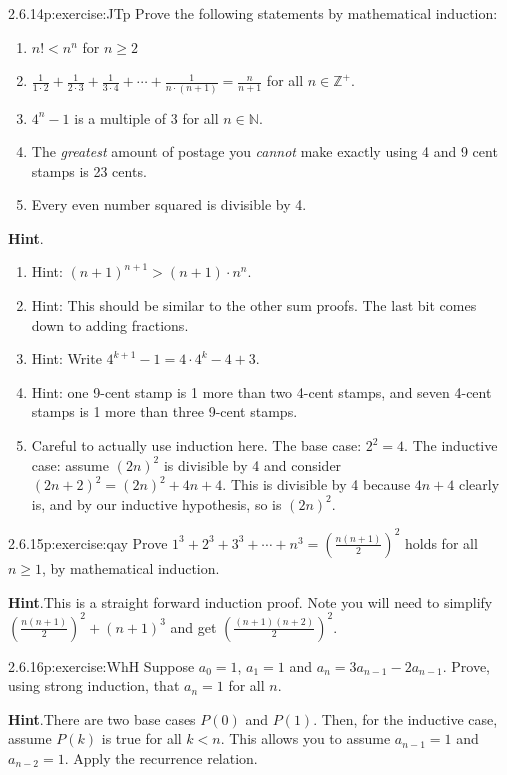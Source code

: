 \documentclass[twoside,11pt,]{book}
\newcommand{\blocktitlefont}{\relax}
\numberwithin{equation}{chapter}
\renewcommand{\d}{\displaystyle}
\newcommand{\N}{\mathbb N}
\newcommand{\Z}{\mathbb Z}
\newcommand{\lt}{<}
\begin{document}
\begin{divisionsolution}{2.6.14}{}{p:exercise:JTp}%
Prove the following statements by mathematical induction:%
\begin{enumerate}[label=(\alph*)]
\item{}\(n! \lt n^n\) for \(n \ge 2\)%
\item{}\(\d\frac{1}{1\cdot 2} + \frac{1}{2\cdot 3} +\frac{1}{3\cdot 4}+\cdots + \frac{1}{n\cdot(n+1)} = \d\frac{n}{n+1}\) for all \(n \in \Z^+\).%
\item{}\(4^n - 1\) is a multiple of 3 for all \(n \in \N\).%
\item{}The \emph{greatest} amount of postage you \emph{cannot} make exactly using 4 and 9 cent stamps is 23 cents.%
\item{}Every even number squared is divisible by 4.%
\end{enumerate}
%
\par\smallskip%
\noindent\textbf{\blocktitlefont Hint}.\quad{}%
\begin{enumerate}[label=(\alph*)]
\item{}Hint: \((n+1)^{n+1} > (n+1) \cdot n^{n}\).%
\item{}Hint: This should be similar to the other sum proofs. The last bit comes down to adding fractions.%
\item{}Hint: Write \(4^{k+1} - 1 = 4\cdot 4^k - 4 + 3\).%
\item{}Hint: one 9-cent stamp is 1 more than two 4-cent stamps, and seven 4-cent stamps is 1 more than three 9-cent stamps.%
\item{}Careful to actually use induction here. The base case: \(2^2 = 4\). The inductive case: assume \((2n)^2\) is divisible by 4 and consider \((2n+2)^2 = (2n)^2 + 4n + 4\). This is divisible by 4 because \(4n +4\) clearly is, and by our inductive hypothesis, so is \((2n)^2\).%
\end{enumerate}
%
\end{divisionsolution}%
\begin{divisionsolution}{2.6.15}{}{p:exercise:qay}%
Prove \(1^3 + 2^3 + 3^3 + \cdots + n^3 = \left(\frac{n(n+1)}{2}\right)^2\) holds for all \(n \ge 1\), by mathematical induction.%
\par\smallskip%
\noindent\textbf{\blocktitlefont Hint}.\quad{}This is a straight forward induction proof. Note you will need to simplify \(\left(\frac{n(n+1)}{2}\right)^2 + (n+1)^3\) and get \(\left(\frac{(n+1)(n+2)}{2}\right)^2\).%
\end{divisionsolution}%
\begin{divisionsolution}{2.6.16}{}{p:exercise:WhH}%
Suppose \(a_0 = 1\), \(a_1 = 1\) and \(a_n = 3a_{n-1} - 2a_{n-1}\). Prove, using strong induction, that \(a_n = 1\) for all \(n\).%
\par\smallskip%
\noindent\textbf{\blocktitlefont Hint}.\quad{}There are two base cases \(P(0)\) and \(P(1)\). Then, for the inductive case, assume \(P(k)\) is true for all \(k \lt n\). This allows you to assume \(a_{n-1} = 1\) and \(a_{n-2} = 1\). Apply the recurrence relation.%
\end{divisionsolution}%
\end{document}
